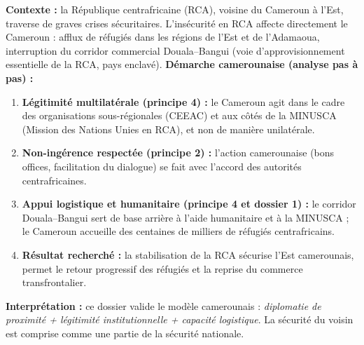\documentclass[11pt]{article}
\begin{document}
\begin{experience}
\textbf{Contexte :} la République centrafricaine (RCA), voisine du Cameroun à l'Est, traverse de graves crises sécuritaires. L'insécurité en RCA affecte directement le Cameroun : afflux de réfugiés dans les régions de l'Est et de l'Adamaoua, interruption du corridor commercial Douala--Bangui (voie d'approvisionnement essentielle de la RCA, pays enclavé).
\textbf{Démarche camerounaise (analyse pas à pas) :}
\begin{enumerate}
    \item \textbf{Légitimité multilatérale (principe 4) :} le Cameroun agit dans le cadre des organisations sous-régionales (CEEAC) et aux côtés de la MINUSCA (Mission des Nations Unies en RCA), et non de manière unilatérale.
    \item \textbf{Non-ingérence respectée (principe 2) :} l'action camerounaise (bons offices, facilitation du dialogue) se fait avec l'accord des autorités centrafricaines.
    \item \textbf{Appui logistique et humanitaire (principe 4 et dossier 1) :} le corridor Douala--Bangui sert de base arrière à l'aide humanitaire et à la MINUSCA ; le Cameroun accueille des centaines de milliers de réfugiés centrafricains.
    \item \textbf{Résultat recherché :} la stabilisation de la RCA sécurise l'Est camerounais, permet le retour progressif des réfugiés et la reprise du commerce transfrontalier.
\end{enumerate}
\textbf{Interprétation :} ce dossier valide le modèle camerounais : \emph{diplomatie de proximité + légitimité institutionnelle + capacité logistique}. La sécurité du voisin est comprise comme une partie de la sécurité nationale.
\end{experience}
\end{document}
